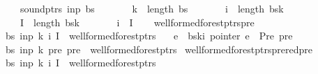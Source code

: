 \begin{isabellebody}
\ \ \ \ \ \ sound{\isacharunderscore}{\kern0pt}ptrs\ inp\ bs\ {\isasymand}\isanewline
\ \ \ \ \ \ k\ {\isacharless}{\kern0pt}\ length\ bs\ {\isasymand}\isanewline
\ \ \ \ \ \ i\ {\isacharless}{\kern0pt}\ length\ {\isacharparenleft}{\kern0pt}bs{\isacharbang}{\kern0pt}k{\isacharparenright}{\kern0pt}\ {\isasymand}\isanewline
\ \ \ \ \ \ I\ {\isasymsubseteq}\ {\isacharbraceleft}{\kern0pt}{}{\isachardot}{\kern0pt}{\isachardot}{\kern0pt}{\isacharless}{\kern0pt}length\ {\isacharparenleft}{\kern0pt}bs{\isacharbang}{\kern0pt}k{\isacharparenright}{\kern0pt}{\isacharbraceright}{\kern0pt}\ {\isasymand}\isanewline
\ \ \ \ \ \ i\ {\isasymin}\ I\isanewline
\ \ {\isacharbraceright}{\kern0pt}{\isachardoublequoteclose}\isanewline
\isanewline
{}\isamarkupfalse%
\ wellformed{\isacharunderscore}{\kern0pt}forest{\isacharunderscore}{\kern0pt}ptrs{\isacharunderscore}{\kern0pt}pre{\isacharcolon}{\kern0pt}\isanewline
\ \ \ {\isachardoublequoteopen}{\isacharparenleft}{\kern0pt}bs{\isacharcomma}{\kern0pt}\ inp{\isacharcomma}{\kern0pt}\ k{\isacharcomma}{\kern0pt}\ i{\isacharcomma}{\kern0pt}\ I{\isacharparenright}{\kern0pt}\ {\isasymin}\ wellformed{\isacharunderscore}{\kern0pt}forest{\isacharunderscore}{\kern0pt}ptrs{\isachardoublequoteclose}\isanewline
\ \ \ {\isachardoublequoteopen}e\ {\isacharequal}{\kern0pt}\ bs{\isacharbang}{\kern0pt}k{\isacharbang}{\kern0pt}i{\isachardoublequoteclose}\ {\isachardoublequoteopen}pointer\ e\ {\isacharequal}{\kern0pt}\ Pre\ pre{\isachardoublequoteclose}\isanewline
\ \ \ {\isachardoublequoteopen}{\isacharparenleft}{\kern0pt}bs{\isacharcomma}{\kern0pt}\ inp{\isacharcomma}{\kern0pt}\ {\isacharparenleft}{\kern0pt}k{\isacharminus}{\kern0pt}{}{\isacharparenright}{\kern0pt}{\isacharcomma}{\kern0pt}\ pre{\isacharcomma}{\kern0pt}\ {\isacharbraceleft}{\kern0pt}pre{\isacharbraceright}{\kern0pt}{\isacharparenright}{\kern0pt}\ {\isasymin}\ wellformed{\isacharunderscore}{\kern0pt}forest{\isacharunderscore}{\kern0pt}ptrs{\isachardoublequoteclose}%
\isadelimproof
%
\endisadelimproof
%
\isatagproof
%
\endisatagproof
{\isafoldproof}%
%
\isadelimproof
\isanewline
%
\endisadelimproof
{}\isamarkupfalse%
\ wellformed{\isacharunderscore}{\kern0pt}forest{\isacharunderscore}{\kern0pt}ptrs{\isacharunderscore}{\kern0pt}prered{\isacharunderscore}{\kern0pt}pre{\isacharcolon}{\kern0pt}\isanewline
\ \ \ {\isachardoublequoteopen}{\isacharparenleft}{\kern0pt}bs{\isacharcomma}{\kern0pt}\ inp{\isacharcomma}{\kern0pt}\ k{\isacharcomma}{\kern0pt}\ i{\isacharcomma}{\kern0pt}\ I{\isacharparenright}{\kern0pt}\ {\isasymin}\ wellformed{\isacharunderscore}{\kern0pt}forest{\isacharunderscore}{\kern0pt}ptrs{\isachardoublequoteclose}\isanewline

\end{isabellebody}
